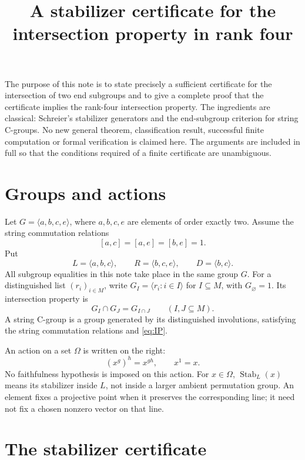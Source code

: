 \documentclass[11pt]{article}
\title{A stabilizer certificate for the intersection property in rank four}
\author{}
\date{}
\theoremstyle{remark}
\newcommand{\gen}[1]{\langle #1\rangle}
\newcommand{\Stab}{\operatorname{Stab}}
\begin{document}
\maketitle

\noindent
The purpose of this note is to state precisely a sufficient certificate for
the intersection of two end subgroups and to give a complete proof that the
certificate implies the rank-four intersection property. The ingredients are
classical: Schreier's stabilizer generators and the end-subgroup criterion
for string C-groups. No new general theorem, classification result, successful
finite computation or formal verification is claimed here. The arguments are
included in full so that the conditions required of a finite certificate are
unambiguous.

\section{Groups and actions}

Let $G=\gen{a,b,c,e}$, where $a,b,c,e$ are elements of order exactly two.
Assume the string commutation relations
\begin{equation}\label{eq:string}
 [a,c]=[a,e]=[b,e]=1.
\end{equation}
Put
\[
 L=\gen{a,b,c},\qquad R=\gen{b,c,e},\qquad D=\gen{b,c}.
\]
All subgroup equalities in this note take place in the same group $G$.
For a distinguished list $(r_i)_{i\in M}$, write
$G_I=\gen{r_i:i\in I}$ for $I\subseteq M$, with $G_\varnothing=1$.
Its intersection property is
\begin{equation}\label{eq:IP}
 G_I\cap G_J=G_{I\cap J}\qquad(I,J\subseteq M).
\end{equation}
A string C-group is a group generated by its distinguished involutions,
satisfying the string commutation relations and \eqref{eq:IP}.

An action on a set $\Omega$ is written on the right:
\[
 (x^g)^h=x^{gh},\qquad x^1=x.
\]
No faithfulness hypothesis is imposed on this action. For $x\in\Omega$,
$\Stab_L(x)$ means its stabilizer inside $L$, not inside a larger ambient
permutation group. An element fixes a projective point when it preserves the
corresponding line; it need not fix a chosen nonzero vector on that line.

\section{The stabilizer certificate}
\end{document}
